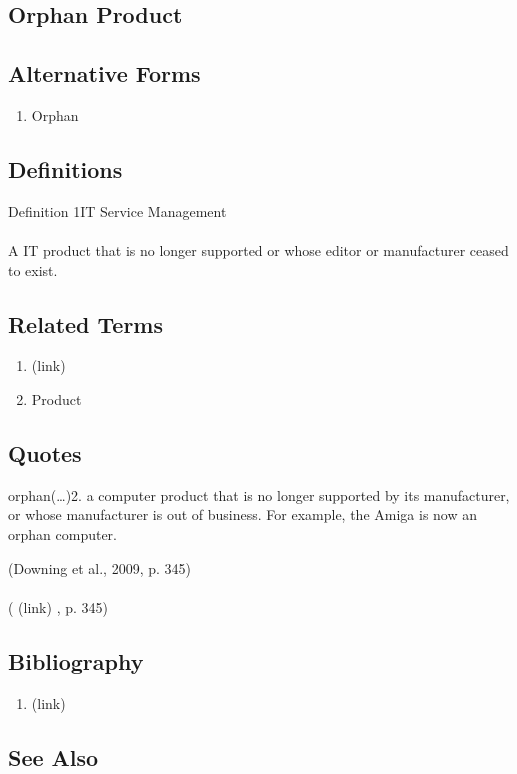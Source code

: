 \newpage \subsection*{Orphan Product } \subsection*{Alternative Forms } \begin{enumerate} \item  Orphan  \end{enumerate} \subsection*{Definitions } \begin{DIC_Def}{Definition 1IT Service Management }{} \paragraph{} A IT product that is no longer supported or whose editor or manufacturer ceased to exist.  \end{DIC_Def} \subsection*{Related Terms } \begin{enumerate} \item  (link) \href{Orphan (Dictionary Entry) }{ } \item  Product  \end{enumerate} \subsection*{Quotes } \begin{DIC_BlockQuote} orphan(\ldots)2. a computer product that is no longer supported by its manufacturer, or whose manufacturer is out of business. For example, the Amiga is now an orphan computer.  \end{DIC_BlockQuote} (Downing et al., 2009, p. 345)  \paragraph{} (  (link) \href{Downing et al., 2009 }{ } , p. 345)  \subsection*{Bibliography } \begin{enumerate} \item  (link) \href{Downing et al., 2009 }{ }   \end{enumerate} \subsection*{See Also } 